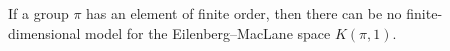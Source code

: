 If a group $\pi$ has an element of finite order, then there can be no finite-dimensional model for the Eilenberg--MacLane space $K(\pi, 1)$.

